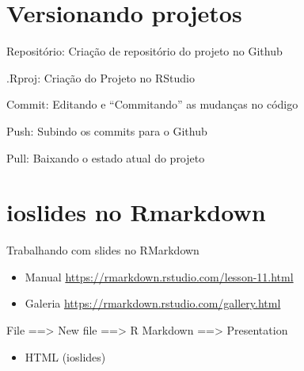 \documentclass[
  9pt,
  ignorenonframetext,
]{beamer}
\providecommand{\tightlist}{%
  \setlength{\itemsep}{0pt}\setlength{\parskip}{0pt}}
\begin{document}
\hypertarget{versionando-projetos}{%
\section{Versionando projetos}\label{versionando-projetos}}

\begin{frame}{}
\protect\hypertarget{section-12}{}
\end{frame}

\begin{frame}{Repositório: Criação de repositório do projeto no Github}
\protect\hypertarget{reposituxf3rio-criauxe7uxe3o-de-reposituxf3rio-do-projeto-no-github}{}
\end{frame}

\begin{frame}{.Rproj: Criação do Projeto no RStudio}
\protect\hypertarget{rproj-criauxe7uxe3o-do-projeto-no-rstudio}{}
\end{frame}

\begin{frame}{Commit: Editando e ``Commitando'' as mudanças no código}
\protect\hypertarget{commit-editando-e-commitando-as-mudanuxe7as-no-cuxf3digo}{}
\end{frame}

\begin{frame}{Push: Subindo os commits para o Github}
\protect\hypertarget{push-subindo-os-commits-para-o-github}{}
\end{frame}

\begin{frame}{Pull: Baixando o estado atual do projeto}
\protect\hypertarget{pull-baixando-o-estado-atual-do-projeto}{}
\end{frame}

\hypertarget{ioslides-no-rmarkdown}{%
\section{ioslides no Rmarkdown}\label{ioslides-no-rmarkdown}}

\begin{frame}{Trabalhando com slides no RMarkdown}
\protect\hypertarget{trabalhando-com-slides-no-rmarkdown}{}
\begin{itemize}
\item
  Manual \url{https://rmarkdown.rstudio.com/lesson-11.html}
\item
  Galeria \url{https://rmarkdown.rstudio.com/gallery.html}
\end{itemize}

File ==\textgreater{} New file ==\textgreater{} R Markdown
==\textgreater{} Presentation

\begin{itemize}
\tightlist
\item
  HTML (ioslides)
\end{itemize}
\end{frame}
\end{document}
